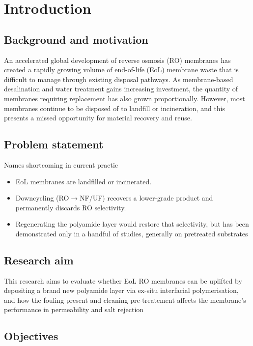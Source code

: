 \chapter{Introduction}
\label{ch:introduction}


\section{Background and motivation}
\label{sec:background}


An accelerated global development of reverse osmosis (RO) membranes has created a rapidly growing volume of end-of-life (EoL) membrane waste that is difficult to manage through existing disposal pathways. As membrane-based desalination and water treatment gains increasing investment, the quantity of membranes requiring replacement has also grown proportionally. However, most membranes continue to be disposed of to landfill or incineration, and this presents a missed opportunity for material recovery and reuse.


\section{Problem statement}
\label{sec:problem}
Names shortcoming in current practic

\begin{itemize}
  \item EoL membranes are landfilled or incinerated.
  \item Downcycling (RO$\rightarrow$NF/UF) recovers a lower-grade product and permanently discards RO selectivity.
  \item Regenerating the polyamide layer would restore that selectivity, but has been demonstrated only in a handful of studies, generally on pretreated substrates
\end{itemize}


\section{Research aim}
\label{sec:aim}
This research aims to evaluate whether EoL RO membranes can be uplifted by depositing a brand new polyamide layer via ex-situ interfacial polymerisation, and how the fouling present and cleaning pre-treatement affects the membrane's performance in permeability and salt rejection

\section{Objectives}
\label{sec:objectives}

